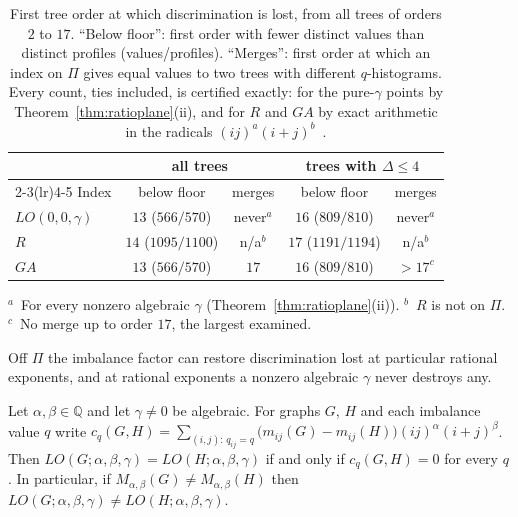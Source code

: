 \begin{table}[htbp]
\centering
\caption{First tree order at which discrimination is lost, from all trees
of orders $2$ to $17$. ``Below floor'': first order with fewer distinct
values than distinct profiles (values/profiles). ``Merges'': first order
at which an index on $\Pi$ gives equal values to two trees with
different $q$-histograms. Every count, ties included, is certified
exactly: for the pure-$\gamma$ points by Theorem~\ref{thm:ratioplane}(ii),
and for $R$ and $GA$ by exact arithmetic in the radicals
$(ij)^{a}(i+j)^{b}$~\cite{Besicovitch1940}.}
\label{tab:firstfail}
\small
\setlength{\tabcolsep}{3pt}
\begin{tabular}{lcccc}
\toprule
 & \multicolumn{2}{c}{all trees} & \multicolumn{2}{c}{trees with $\Delta \le 4$}\\
\cmidrule(lr){2-3}\cmidrule(lr){4-5}
Index & below floor & merges & below floor & merges\\
\midrule
$LO(0,0,\gamma)$ & $13$ ($566/570$) & never$^{a}$ & $16$ ($809/810$) & never$^{a}$\\
$R$ & $14$ ($1095/1100$) & n/a$^{b}$ & $17$ ($1191/1194$) & n/a$^{b}$\\
$GA$ & $13$ ($566/570$) & $17$ & $16$ ($809/810$) & $> 17^{c}$\\
\bottomrule
\end{tabular}

\smallskip
\begin{minipage}{0.95\linewidth}\footnotesize
$^{a}$~For every nonzero algebraic $\gamma$
(Theorem~\ref{thm:ratioplane}(ii)). $^{b}$~$R$ is not on $\Pi$.
$^{c}$~No merge up to order $17$, the largest examined.
\end{minipage}
\end{table}

Off $\Pi$ the imbalance factor can restore discrimination lost at
particular rational exponents, and at rational exponents a nonzero
algebraic $\gamma$ never destroys any.

  \begin{proposition}\label{prop:offplane}
  Let $\alpha, \beta \in \mathbb{Q}$ and let $\gamma \ne 0$ be algebraic.
  For graphs $G$, $H$ and each imbalance value $q$ write
  $c_q(G,H) = \sum_{(i,j):\, q_{ij} = q} \bigl(m_{ij}(G) - m_{ij}(H)\bigr)
  (ij)^{\alpha} (i+j)^{\beta}$. Then
  $LO(G;\alpha,\beta,\gamma) = LO(H;\alpha,\beta,\gamma)$ if and only if
  $c_q(G,H) = 0$ for every $q$. In particular, if
  $M_{\alpha,\beta}(G) \ne M_{\alpha,\beta}(H)$ then
  $LO(G;\alpha,\beta,\gamma) \ne LO(H;\alpha,\beta,\gamma)$.
  \end{proposition}

